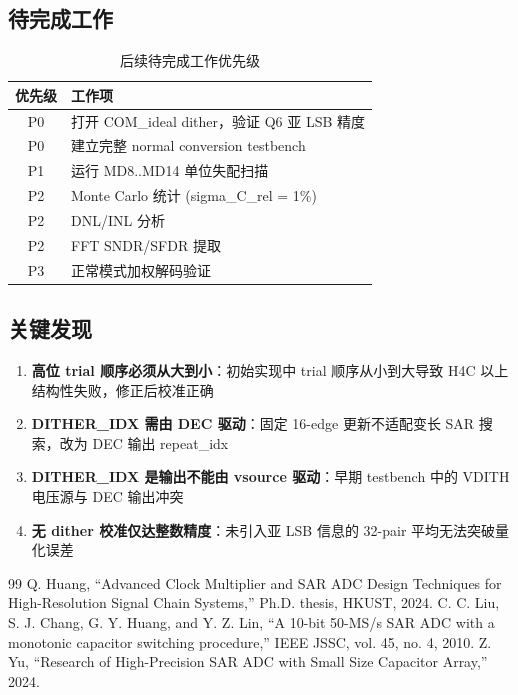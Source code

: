 \documentclass[12pt,a4paper]{article}
\begin{document}
\subsection{待完成工作}
\begin{table}[H]
\centering
\caption{后续待完成工作优先级}
\begin{tabular}{cl}
\toprule
优先级 & 工作项 \\
\midrule
P0 & 打开 COM\_ideal dither，验证 Q6 亚 LSB 精度 \\
P0 & 建立完整 normal conversion testbench \\
P1 & 运行 MD8..MD14 单位失配扫描 \\
P2 & Monte Carlo 统计 (sigma\_C\_rel = 1\%) \\
P2 & DNL/INL 分析 \\
P2 & FFT SNDR/SFDR 提取 \\
P3 & 正常模式加权解码验证 \\
\bottomrule
\end{tabular}
\end{table}

\subsection{关键发现}
\begin{enumerate}
  \item \textbf{高位 trial 顺序必须从大到小}：初始实现中 trial 顺序从小到大导致 H4C 以上结构性失败，修正后校准正确
  \item \textbf{DITHER\_IDX 需由 DEC 驱动}：固定 16-edge 更新不适配变长 SAR 搜索，改为 DEC 输出 repeat\_idx
  \item \textbf{DITHER\_IDX 是输出不能由 vsource 驱动}：早期 testbench 中的 VDITH 电压源与 DEC 输出冲突
  \item \textbf{无 dither 校准仅达整数精度}：未引入亚 LSB 信息的 32-pair 平均无法突破量化误差
\end{enumerate}

\begin{thebibliography}{99}
 Q. Huang, ``Advanced Clock Multiplier and SAR ADC Design Techniques for High-Resolution Signal Chain Systems,'' Ph.D. thesis, HKUST, 2024.
 C. C. Liu, S. J. Chang, G. Y. Huang, and Y. Z. Lin, ``A 10-bit 50-MS/s SAR ADC with a monotonic capacitor switching procedure,'' IEEE JSSC, vol. 45, no. 4, 2010.
 Z. Yu, ``Research of High-Precision SAR ADC with Small Size Capacitor Array,'' 2024.
\end{thebibliography}
\end{document}
